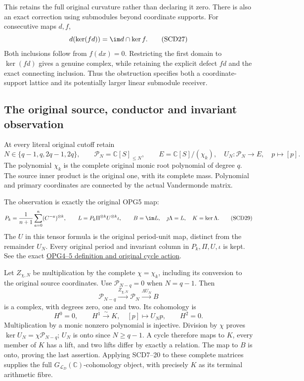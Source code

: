 \documentclass[11pt,a4paper]{article}
\theoremstyle{definition}\newtheorem{definition}[theorem]{Definition}
\newcommand{\C}{\mathbb C}\newcommand{\R}{\mathbb R}
\newcommand{\Pp}{\mathcal P}\newcommand{\LL}{\mathcal L}
\begin{document}
This retains the full original curvature rather than declaring it zero.
There is also an exact correction using submodules beyond coordinate
supports. For consecutive maps \(d,f\),
\[
 d(\ker(fd))=\im d\cap\ker f .
 \tag{SCD27}
\]
Both inclusions follow from \(f(dx)=0\). Restricting the first
domain to \(\ker(fd)\) gives a genuine complex, while retaining
the explicit defect \(fd\) and the exact connecting inclusion.
Thus the obstruction specifies both a coordinate-support lattice
and its potentially larger linear submodule receiver.

\subsection{The original source, conductor and invariant observation}

At every literal original cutoff retain
\[
 N\in\{q-1,q,2q-1,2q\},\qquad
 \Pp_N=\C[S]_{\le N},\qquad E=\C[S]/(\chi_k),
 \quad U_N:\Pp_N\to E,\quad p\mapsto[p].
 \tag{SCD28}
\]
The polynomial \(\chi_k\) is the complete original monic root
polynomial of degree \(q\). The source inner product is the original
one, with its complete mass. Polynomial and primary coordinates
are connected by the actual Vandermonde matrix.

The observation is exactly the original OPG5 map:
\[
 P_k=\frac1{n+1}\sum_{a=0}^{n}(C^{-a})^{\otimes k},\qquad
 L=P_k\Pi^{\otimes k}U^{\otimes k}\iota,\qquad
 B=\im L,\quad\jmath\Lambda=L,\quad K=\ker\Lambda .
 \tag{SCD29}
\]
The \(U\) in this tensor formula is the original period-unit map,
distinct from the remainder \(U_N\). Every original period and
invariant column in \(P_k,\Pi,U,\iota\) is kept. See the exact
\href{https://github.com/KokunoYumeto/zeta-function-research-reader/blob/6cf5b3aa8ff395eba6b5512b28d117334da5767b/workbenches/splitzero-tandem/continuations/20260922-cutoff-profile/RETAINED_COMPLETE_PROOF_SOURCES.tex#L9420}{OPG4--5 definition and original cycle action}.

Let \(Z_{\chi,N}\) be multiplication by the complete \(\chi=\chi_k\),
including its conversion to the original source coordinates.
Use \(\Pp_{N-q}=0\) when \(N=q-1\). Then
\[
 \Pp_{N-q}\xrightarrow{Z_{\chi,N}}\Pp_N
                  \xrightarrow{\Lambda U_N}B
 \tag{SCD30}
\]
is a complex, with degrees zero, one and two. Its cohomology is
\[
 H^0=0,\qquad
 H^1\xrightarrow{\sim}K,\quad[p]\mapsto U_Np,\qquad H^2=0.
 \tag{SCD31}
\]
Multiplication by a monic nonzero polynomial is injective.
Division by \(\chi\) proves
\(\ker U_N=\chi\Pp_{N-q}\); \(U_N\) is onto since \(N\ge q-1\).
A cycle therefore maps to \(K\), every member of \(K\) has a lift,
and two lifts differ by exactly a relation. The map to \(B\)
is onto, proving the last assertion. Applying SCD7--20 to these
complete matrices supplies the full \(G_{\LL_D}(\C)\)-cohomology
object, with precisely \(K\) as its terminal arithmetic fibre.
\end{document}
